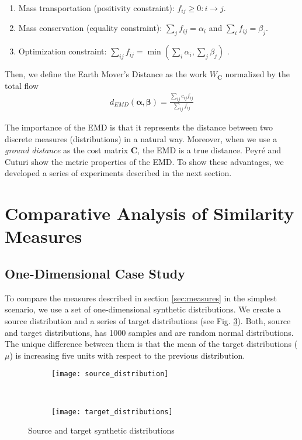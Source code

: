 \begin{enumerate}%
 \item Mass transportation (positivity constraint): $f_{ij} \geq 0 : i\rightarrow j$.
 \item Mass conservation (equality constraint):  $\sum_{j}f_{ij}=\alpha_i$ and $\sum_{i}f_{ij}= \beta_j$.
 \item Optimization constraint: $\sum_{ij}f_{ij} = \min \left( \sum_{i}\alpha_i, \sum_{j}\beta_j \right)$ .
\end{enumerate}  

Then, we define the Earth Mover's Distance as the work $W_{\mathbf{C}}$ normalized by the total flow
\begin{eqnarray}
d_{EMD}(\boldsymbol{\alpha}, \boldsymbol{\beta}) = \frac{\sum_{ij}c_{ij}f_{ij}}{\sum_{ij}f_{ij}}
\label{eq:emd}
\end{eqnarray}

The importance of the EMD is that it represents the distance between two discrete measures (distributions) in a natural way. Moreover, when we use a \textit{ground distance} as the cost matrix $\mathbf{C}$, the EMD is a true distance. Peyré and Cuturi \citep{Peyre.Cuturi:arXiv:2018} show the metric properties of the EMD. To show these advantages, we developed a series of experiments described in the next section.


\section{Comparative Analysis of Similarity Measures}\label{sec:comparison}

\subsection{One-Dimensional Case Study}\label{subsec:1d_case}
To compare the measures described in section \ref{sec:measures} in the simplest scenario, we use a set of one-dimensional synthetic distributions. We create a source distribution and a series of target distributions (see Fig. \ref{fig:source_target_dist}). Both, source and target distributions, has 1000 samples and are random normal distributions. The unique difference between them is that the mean of the target distributions ($\mu$) is increasing five units with respect to the previous distribution.

\begin{figure}[ht] 
	\centering
	\begin{subfigure}[b]{0.45\textwidth}
		\centering
		\texttt{[image: source\_distribution]}	
		\label{fig:source_distribution}
	\end{subfigure}
	~ %
	\begin{subfigure}[b]{0.45\textwidth}
		\centering
		\texttt{[image: target\_distributions]}	
		\label{fig:targert_distributions}
	\end{subfigure}

  \caption{Source and target synthetic distributions}
  \label{fig:source_target_dist}
\end{figure}


